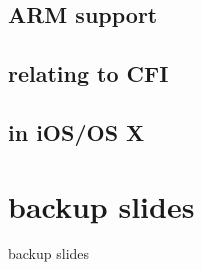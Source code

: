 \subsection{ARM support}

\subsection{relating to CFI}

\subsection{in iOS/OS X}



\section{backup slides}
\begin{frame}{backup slides}
\end{frame}




